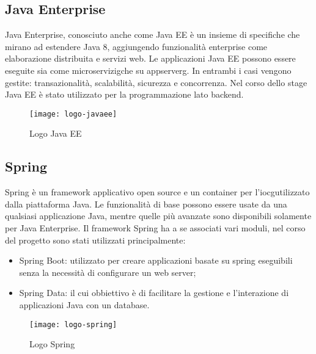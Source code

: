 \subsection{Java Enterprise}
Java Enterprise, conosciuto anche come Java EE è un insieme di specifiche che mirano ad estendere Java 8, aggiungendo funzionalità enterprise come elaborazione distribuita e servizi web. Le applicazioni Java EE possono essere eseguite sia come \gls{microservizig}\glsfirstoccur che su \gls{appserverg}\glsfirstoccur. In entrambi i casi vengono gestite: transazionalità, scalabilità, sicurezza e concorrenza.
Nel corso dello stage Java EE è stato utilizzato per la programmazione lato backend.
\begin{figure}[h]
    \begin{center}
    \texttt{[image: logo-javaee]}
    \caption{Logo Java EE}
    \label{fig:figure3}
    \end{center}
\end{figure}

\subsection{Spring}
Spring è un framework applicativo open source e un container per l'\gls{iocg}\glsfirstoccur utilizzato dalla piattaforma Java. Le funzionalità di base possono essere usate da una qualsiasi applicazione Java, mentre quelle più avanzate sono disponibili solamente per Java Enterprise.
Il framework Spring ha a se associati vari moduli, nel corso del progetto sono stati utilizzati principalmente:
\begin{itemize}
    \item Spring Boot: utilizzato per creare applicazioni basate su spring eseguibili senza la necessità di configurare un web server;
    \item Spring Data: il cui obbiettivo è di facilitare la gestione e l'interazione di applicazioni Java con un database.
\end{itemize}
\begin{figure}[h]
    \begin{center}
    \texttt{[image: logo-spring]}
    \caption{Logo Spring}
    \label{fig:figure4}
    \end{center}
\end{figure}


